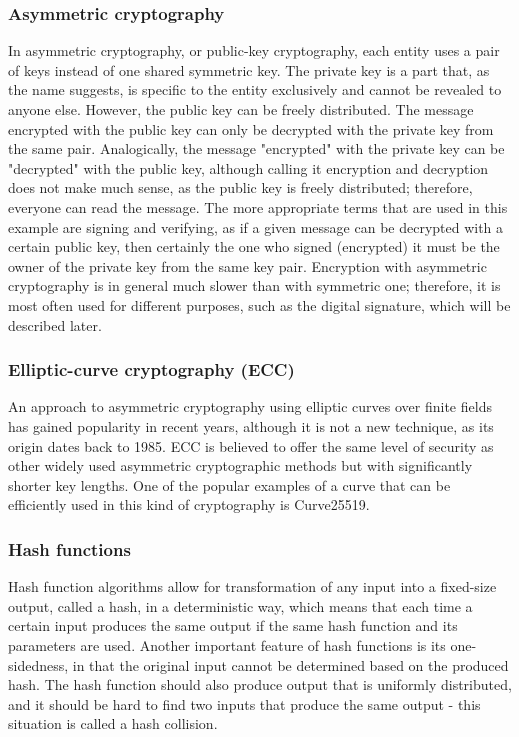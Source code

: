 \subsubsection{Asymmetric cryptography}
In asymmetric cryptography, or public-key cryptography, each entity uses a pair of keys instead of one shared symmetric key. The private key is a part that, as the name suggests, is specific to the entity exclusively and cannot be revealed to anyone else. However, the public key can be freely distributed. The message encrypted with the public key can only be decrypted with the private key from the same pair. Analogically, the message "encrypted" with the private key can be "decrypted" with the public key, although calling it encryption and decryption does not make much sense, as the public key is freely distributed; therefore, everyone can read the message. The more appropriate terms that are used in this example are signing and verifying, as if a given message can be decrypted with a certain public key, then certainly the one who signed (encrypted) it must be the owner of the private key from the same key pair.
Encryption with asymmetric cryptography is in general much slower than with symmetric one; therefore, it is most often used for different purposes, such as the digital signature, which will be described later.

\subsubsection{Elliptic-curve cryptography (ECC)}
An approach to asymmetric cryptography using elliptic curves over finite fields has gained popularity in recent years, although it is not a new technique, as its origin dates back to 1985. ECC is believed to offer the same level of security as other widely used asymmetric cryptographic methods but with significantly shorter key lengths. One of the popular examples of a curve that can be efficiently used in this kind of cryptography is Curve25519.

\subsubsection{Hash functions}
Hash function algorithms allow for transformation of any input into a fixed-size output, called a hash, in a deterministic way, which means that each time a certain input produces the same output if the same hash function and its parameters are used. Another important feature of hash functions is its one-sidedness, in that the original input cannot be determined based on the produced hash. The hash function should also produce output that is uniformly distributed, and it should be hard to find two inputs that produce the same output - this situation is called a hash collision.

